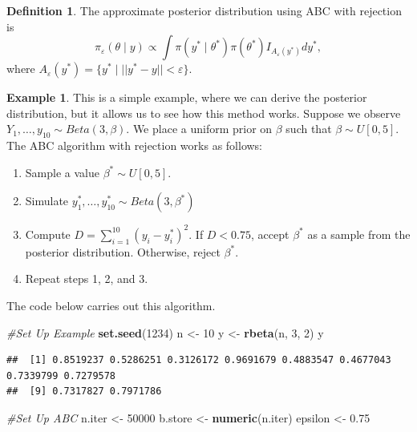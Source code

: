 \documentclass[
]{book}
\newenvironment{Shaded}{\begin{snugshade}}{\end{snugshade}}
\newcommand{\CommentTok}[1]{\textcolor[rgb]{0.56,0.35,0.01}{\textit{#1}}}
\newcommand{\DecValTok}[1]{\textcolor[rgb]{0.00,0.00,0.81}{#1}}
\newcommand{\FloatTok}[1]{\textcolor[rgb]{0.00,0.00,0.81}{#1}}
\newcommand{\FunctionTok}[1]{\textcolor[rgb]{0.13,0.29,0.53}{\textbf{#1}}}
\newcommand{\NormalTok}[1]{#1}
\newcommand{\OtherTok}[1]{\textcolor[rgb]{0.56,0.35,0.01}{#1}}
\providecommand{\tightlist}{%
  \setlength{\itemsep}{0pt}\setlength{\parskip}{0pt}}
\theoremstyle{definition}
\newtheorem{definition}{Definition}[chapter]
\theoremstyle{definition}
\newtheorem{example}{Example}[chapter]
\theoremstyle{definition}
\theoremstyle{definition}
\theoremstyle{remark}
\begin{document}
\begin{definition}
The approximate posterior distribution using ABC with rejection is
\[
\pi_\varepsilon(\theta \mid y) \propto \int \pi(y^* \mid \theta^*)\pi(\theta^*)I_{A_\varepsilon(y^*)} dy^*,
\]
where \({A_\varepsilon(y^*)} = \{y^* \mid ||y^* - y||< \varepsilon\}\).
\end{definition}

\begin{example}

This is a simple example, where we can derive the posterior distribution, but it allows us to see how this method works. Suppose we observe \(Y_1, \ldots, y_{10}\sim Beta(3, \beta)\). We place a uniform prior on \(\beta\) such that \(\beta \sim U[0, 5]\). The ABC algorithm with rejection works as follows:

\begin{enumerate}
\def\labelenumi{\arabic{enumi}.}
\tightlist
\item
  Sample a value \(\beta^* \sim U[0, 5]\).
\item
  Simulate \(y^*_1, \ldots, y^*_{10} \sim Beta(3,\beta^*)\)
\item
  Compute \(D = \sum_{i=1}^{10}(y_i -y^*_i)^2\). If \(D < 0.75\), accept \(\beta^*\) as a sample from the posterior distribution. Otherwise, reject \(\beta^*\).
\item
  Repeat steps 1, 2, and 3.
\end{enumerate}

The code below carries out this algorithm.

\begin{Shaded}
\begin{Highlighting}[]
\CommentTok{\#Set Up Example}
\FunctionTok{set.seed}\NormalTok{(}\DecValTok{1234}\NormalTok{)}
\NormalTok{n }\OtherTok{\textless{}{-}} \DecValTok{10}
\NormalTok{y }\OtherTok{\textless{}{-}} \FunctionTok{rbeta}\NormalTok{(n, }\DecValTok{3}\NormalTok{, }\DecValTok{2}\NormalTok{)}
\NormalTok{y}
\end{Highlighting}
\end{Shaded}

\begin{verbatim}
##  [1] 0.8519237 0.5286251 0.3126172 0.9691679 0.4883547 0.4677043 0.7339799 0.7279578
##  [9] 0.7317827 0.7971786
\end{verbatim}

\begin{Shaded}
\begin{Highlighting}[]
\CommentTok{\#Set Up ABC}
\NormalTok{n.iter }\OtherTok{\textless{}{-}} \DecValTok{50000}
\NormalTok{b.store }\OtherTok{\textless{}{-}} \FunctionTok{numeric}\NormalTok{(n.iter)}
\NormalTok{epsilon }\OtherTok{\textless{}{-}} \FloatTok{0.75}


\end{Highlighting}
\end{Shaded}
\end{example}
\end{document}
